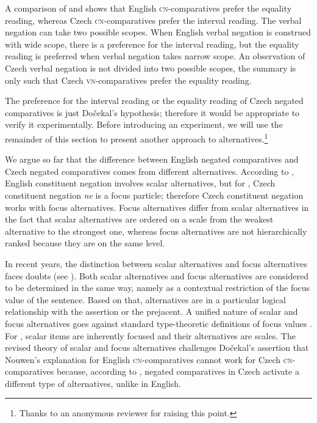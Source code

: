 \documentclass[output=paper,
]{langscibook}
\begin{document}
A comparison of  and  shows that English \textsc{cn-}comparatives prefer the equality reading, whereas Czech \textsc{cn-}comparatives prefer the interval reading. The verbal negation can take two possible scopes. When English verbal negation is construed with wide scope, there is a preference for the interval reading, but the equality reading is preferred when verbal negation takes narrow scope. An observation of Czech verbal negation is not divided into two possible scopes, the summary is only such that Czech \textsc{vn-}comparatives prefer the equality reading.

The preference for the interval reading or the equality reading of Czech negated comparatives is just Dočekal's hypothesis; therefore it would be appropriate to verify it experimentally. Before introducing an experiment, we will use the remainder of this section to present another approach to alternatives.\footnote{Thanks to an anonymous reviewer for raising this point.}

We argue so far that the difference between English negated comparatives and Czech negated comparatives comes from different alternatives. According to \cite{nouwen2008upper}, English constituent negation involves scalar alternatives, but for \cite{dovcekal2017upper}, Czech constituent negation \textit{ne} is a focus particle; therefore Czech constituent negation works with focus alternatives. Focus alternatives differ from scalar alternatives in the fact that scalar alternatives are ordered on a scale from the weakest alternative to the strongest one, whereas focus alternatives are not hierarchically ranked because they are on the same level. 

In recent years, the distinction between scalar alternatives and focus alternatives faces doubts (see \citealt{katzir2007structurally,fox2011characterization,fox2018economy}). Both scalar alternatives and focus alternatives are considered to be determined in the same way, namely as a contextual restriction of the focus value of the sentence. Based on that, alternatives are in a particular logical relationship with the assertion or the prejacent. A unified nature of scalar and focus alternatives goes against standard type-theoretic definitions of focus values \citep{fox2011characterization}. For \citet{krifka1995semantics}, scalar items are inherently focused and their alternatives are scales. The revised theory of scalar and focus alternatives challenges Dočekal's assertion that Nouwen's explanation for English \textsc{cn-}comparatives cannot work for Czech \textsc{cn-}comparatives because, according to \citet{dovcekal2017upper}, negated comparatives in Czech activate a different type of alternatives, unlike in English. 
\end{document}
